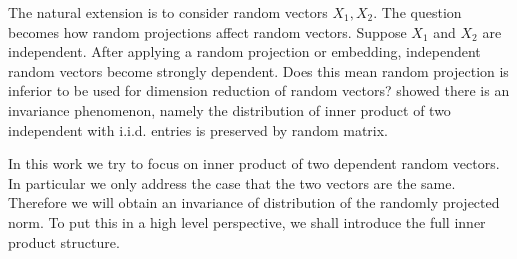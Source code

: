 \documentclass[12pt]{extarticle}
\newtheorem{theorem}{Theorem}
\newcommand{\cN}{{\mathcal{N}}}
\newcommand{\field}[1]{\mathbb{#1}}
\newcommand{\R}{\field{R}}
\newcommand{\1}{\field{1}}
\newcommand{\p}{\field{P}}
\DeclareMathOperator{\E}{\mathbb{E}}
\newcommand{\mat}[2][rrrrrrrrrrrrrrrrrrrrrrrrrrrrrrrr]{\left[ \begin{array}{#1} #2 \\ \end{array}\right]}
\numberwithin{equation}{section}
\begin{document}
The natural extension is to consider random vectors $X_1, X_2$. The question becomes how random projections affect random vectors. Suppose $X_1$ and $X_2$ are independent. After applying a random projection or embedding, independent random vectors become strongly dependent. Does this mean random projection is inferior to be used for dimension reduction of random vectors?  \cite{duan2021invariance} showed there is an invariance phenomenon, namely the distribution of inner product of two independent with i.i.d. entries is preserved by random matrix. 


  In this work we try to focus on inner product of two dependent random vectors. In particular we only address the case that the two vectors are the same. Therefore we will obtain an invariance of distribution of the randomly projected norm. To put this in a high level perspective, we shall introduce the full inner product structure.
\end{document}
